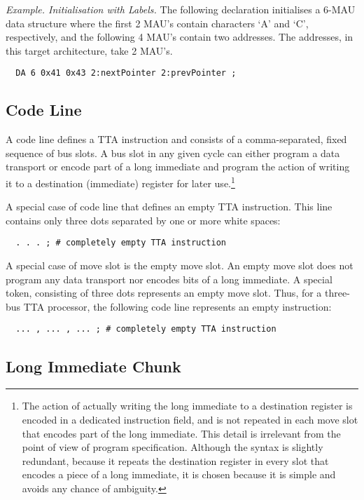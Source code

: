 \documentclass[twoside]{tceusermanual}
\begin{document}
\emph{Example. Initialisation with Labels.}
%
The following declaration initialises a 6-MAU data structure where the first
2 MAU's contain characters `A' and `C', respectively, and the following 4
MAU's contain two addresses. The addresses, in this target architecture,
take 2 MAU's.
\begin{verbatim}
  DA 6 0x41 0x43 2:nextPointer 2:prevPointer ;
\end{verbatim}

\subsection{Code Line}
\label{ssec:code-line}

A code line defines a TTA instruction and consists of a comma-separated,
fixed sequence of bus slots.  A bus slot in any given cycle can either
program a data transport or encode part of a long immediate and program the
action of writing it to a destination (immediate) register for later
use.\footnote{
%
  The action of actually writing the long immediate to a destination
  register is encoded in a dedicated instruction field, and is not repeated
  in each move slot that encodes part of the long immediate.  This detail is
  irrelevant from the point of view of program specification.  Although the
  syntax is slightly redundant, because it repeats the destination register
  in every slot that encodes a piece of a long immediate, it is chosen
  because it is simple and avoids any chance of ambiguity.}

A special case of code line that defines an empty TTA instruction. This line
contains only three dots separated by one or more white spaces:
\begin{verbatim}
  . . . ; # completely empty TTA instruction
\end{verbatim}

A special case of move slot is the empty move slot. An empty move slot does
not program any data transport nor encodes bits of a long immediate. A
special token, consisting of three dots represents an empty move slot.
Thus, for a three-bus TTA processor, the following code line represents an
empty instruction:
\begin{verbatim}
  ... , ... , ... ; # completely empty TTA instruction
\end{verbatim}

\subsection{Long Immediate Chunk}
\end{document}
